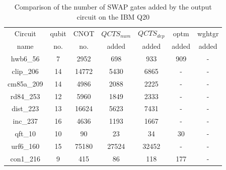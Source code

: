 \documentclass[runningheads]{llncs}
\begin{document}
				\begin{table}[H]
					\label{tab5}
					\begin{center}  
					\begin{tabular}{|c|c|c|c|c|c|c|}
					\hline
					Circuit &  qubit  & CNOT &$QCTS_{num}$& $QCTS_{dep}$  & optm 	 & wghtgr 	\\
					 name	&   no. 	&	no. & added&  added &  added 	&  added\\
					\hline
					hwb6\_56 & 7 & 2952 & 698 & 933 & 909 & - \\ 
clip\_206 & 14 & 14772 & 5430 & 6865 & - & - \\ 
cm85a\_209 & 14 & 4986 & 2088 & 2225 & - & - \\ 
rd84\_253 & 12 & 5960 & 1849 & 2333 & - & - \\ 
dist\_223 & 13 & 16624 & 5623 & 7431 & - & - \\ 
inc\_237 & 16 & 4636 & 1193 & 1667 & - & - \\ 
qft\_10 & 10 & 90 & 23 & 34 & 30 & - \\ 
urf6\_160 & 15 & 75180 & 27524 & 32452 & - & - \\ 
con1\_216 & 9 & 415 & 86 & 118 & 177 & - \\ 
					\hline
					\end{tabular} 
					\end{center}	
					\caption{Comparison of  the number of  SWAP gates added by the 
					output circuit on the IBM Q20 }  
					\label{tab5}
					\end{table}
\end{document}
